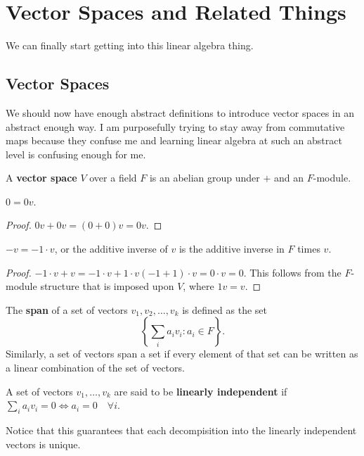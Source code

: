\section{Vector Spaces and Related Things}
We can finally start getting into this linear algebra thing.
\subsection{Vector Spaces}
We should now have enough abstract definitions to introduce vector
spaces in an abstract enough way. I am purposefully trying to stay away
from commutative maps because they confuse me and learning linear
algebra at such an abstract level is confusing enough for me.

\begin{df}
A \textbf{vector space} $V$ over a field $F$ is an abelian group under
$+$ and an $F$-module.
\end{df}

\begin{prop}
$0 = 0v$.
\end{prop}

\begin{proof}
$0v + 0v = (0 + 0) v = 0v$.
\end{proof}

\begin{prop}
$-v = -1 \cdot v$, or the additive inverse of $v$ is the additive
inverse in $F$ times $v$.
\end{prop}

\begin{proof}
$-1 \cdot v + v = -1 \cdot v + 1 \cdot v (-1 + 1) \cdot v = 0 \cdot v =
0$. This follows from the $F$-module structure that is imposed upon $V$,
where $1v = v$.
\end{proof}

\begin{df}
The \textbf{span} of a set of vectors $v_1, v_2, \dots, v_k$ is defined
as the set
\[ \left\lbrace \sum_i a_i v_i : a_i \in F \right\rbrace. \]
Similarly, a set of vectors span a set if every element of that set can
be written as a linear combination of the set of vectors.
\end{df}

\begin{df}
A set of vectors $v_1, \dots, v_k$ are said to be \textbf{linearly
independent} if $\sum_i a_i v_i = 0 \Leftrightarrow a_i = 0 \quad
\forall i$.
\end{df}

\begin{rem}
Notice that this guarantees that each decompisition into the linearly
independent vectors is unique.
\end{rem}


